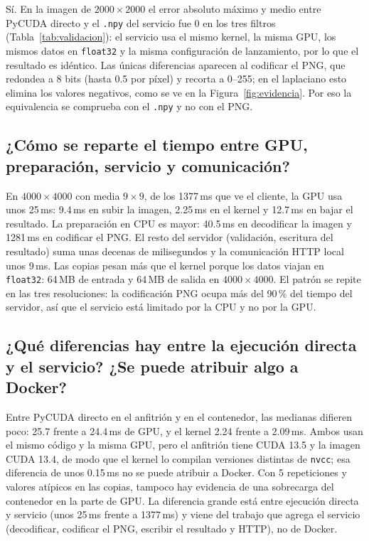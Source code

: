\documentclass[12pt]{article}
\begin{document}
Sí. En la imagen de $2000\times2000$ el error absoluto máximo y medio entre PyCUDA directo y el
\texttt{.npy} del servicio fue 0 en los tres filtros (Tabla~\ref{tab:validacion}): el servicio usa el
mismo kernel, la misma GPU, los mismos datos en \texttt{float32} y la misma configuración de lanzamiento,
por lo que el resultado es idéntico. Las únicas diferencias aparecen al codificar el PNG, que redondea
a 8 bits (hasta 0.5 por píxel) y recorta a 0--255; en el laplaciano esto elimina los valores
negativos, como se ve en la Figura~\ref{fig:evidencia}. Por eso la equivalencia se comprueba con el
\texttt{.npy} y no con el PNG.

\subsection{¿Cómo se reparte el tiempo entre GPU, preparación, servicio y comunicación?}

En $4000\times4000$ con media $9\times9$, de los 1377\,ms que ve el cliente, la GPU usa unos
25\,ms: 9.4\,ms en subir la imagen, 2.25\,ms en el kernel y 12.7\,ms en bajar el resultado. La
preparación en CPU es mayor: 40.5\,ms en decodificar la imagen y 1281\,ms en codificar el PNG. El
resto del servidor (validación, escritura del resultado) suma unas decenas de milisegundos y la
comunicación HTTP local unos 9\,ms. Las copias pesan más que el kernel porque los datos viajan en
\texttt{float32}: 64\,MB de entrada y 64\,MB de salida en $4000\times4000$. El patrón se repite en las
tres resoluciones: la codificación PNG ocupa más del 90\,\% del tiempo del servidor, así que el
servicio está limitado por la CPU y no por la GPU.

\subsection{¿Qué diferencias hay entre la ejecución directa y el servicio? ¿Se puede atribuir algo a Docker?}

Entre PyCUDA directo en el anfitrión y en el contenedor, las medianas difieren poco: 25.7 frente a
24.4\,ms de GPU, y el kernel 2.24 frente a 2.09\,ms. Ambos usan el mismo código y la misma GPU, pero
el anfitrión tiene CUDA 13.5 y la imagen CUDA 13.4, de modo que el kernel lo compilan versiones
distintas de \texttt{nvcc}; esa diferencia de unos 0.15\,ms no se puede atribuir a Docker. Con 5
repeticiones y valores atípicos en las copias, tampoco hay evidencia de una sobrecarga del contenedor
en la parte de GPU. La diferencia grande está entre ejecución directa y servicio (unos 25\,ms frente a
1377\,ms) y viene del trabajo que agrega el servicio (decodificar, codificar el PNG, escribir el
resultado y HTTP), no de Docker.
\end{document}
